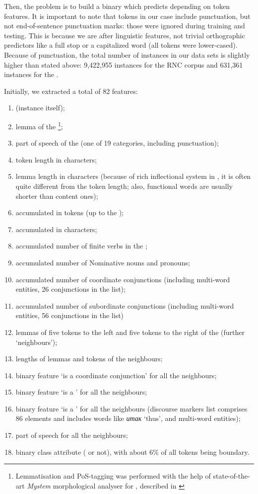 \documentclass[output=paper]{langsci/langscibook.cls}
\begin{document}
Then, the problem is to build a binary  which predicts  depending on token features. It is important to note that tokens in our case include punctuation, but not end-of-sentence punctuation marks: those were ignored during training and testing. This is because we are after linguistic features, not trivial orthographic predictors like a full stop or a capitalized word (all tokens were lower-cased). Because of punctuation, the total number of instances in our data sets is slightly higher than stated above: 9,422,955 instances for the RNC corpus and 631,361 instances for the .

Initially, we extracted a total of 82 features:
\begin{enumerate}
\item {} (instance itself);
\item lemma of the \footnote{Lemmatisation and PoS-tagging was performed with the help of state-of-the-art \textit{Mystem} morphological analyser for , described in \citet{Segalovich:2003}};
\item part of speech of the  (one of 19 categories, including punctuation);
\item token length in characters;
\item lemma length in characters (because of rich inflectional system in , it is often quite different from the token length; also, functional words are usually shorter than content ones);
\item accumulated  in tokens (up to the );
\item accumulated  in characters;
\item accumulated number of finite verbs in the ;
\item accumulated number of Nominative nouns and pronouns;
\item accumulated number of coordinate conjunctions (including multi-word entities, 26 conjunctions in the list);
\item accumulated number of subordinate conjunctions (including multi-word entities, 56 conjunctions in the list)
\item lemmas of five tokens to the left and five tokens to the right of the  (further `neighbours');
\item lengths of lemmas and tokens of the neighbours;
\item binary feature `is a coordinate conjunction' for all the neighbours;
\item binary feature `is a ' for all the neighbours;
\item binary feature `is a ' for all the neighbours (discourse markers list comprises 86 elements and includes words like \textit{итак} `thus', and multi-word entities);
\item part of speech for all the neighbours;
\item binary class attribute ( or not), with about 6\% of all tokens being boundary.
\end{enumerate}
\end{document}
